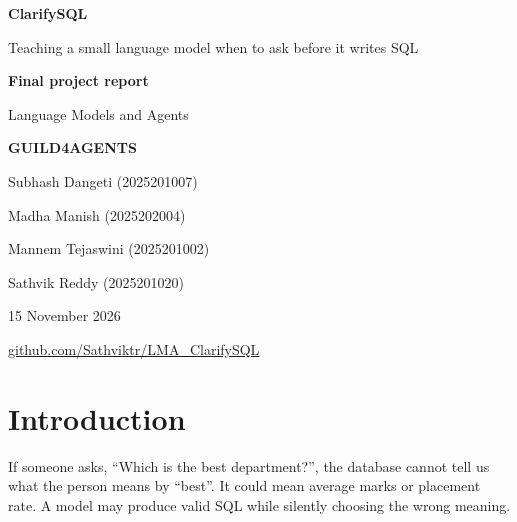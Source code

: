 \documentclass[11pt,a4paper]{article}
\newcommand{\repo}{https://github.com/Sathviktr/LMA_ClarifySQL}
\newcommand{\reportdate}{15 November 2026}
\begin{document}
\begin{center}
{\LARGE\bfseries ClarifySQL}\par
{\large Teaching a small language model when to ask before it writes SQL}\par
\vspace{5pt}
{\large\bfseries Final project report}\par
Language Models and Agents\par
\textbf{GUILD4AGENTS}\par
Subhash Dangeti (2025201007)\par
Madha Manish (2025202004)\par
Mannem Tejaswini (2025201002)\par
Sathvik Reddy (2025201020)\par
\reportdate\par
\href{\repo}{github.com/Sathviktr/LMA\_ClarifySQL}
\end{center}

\begin{abstract}
Text-to-SQL models can write a valid query even when a user's request is missing an important detail.
We built ClarifySQL to study when a small language model should inspect the database, ask a question,
execute a query or abstain. We train QLoRA policy adapters for Qwen3-4B-Instruct-2507 while keeping the
SQL writer fixed. Our constructed dataset has 307 training, 53 validation and 188 test episodes, with
a separate check on 59 CoSQL turns. On 148 answerable test episodes, the two trained seeds average
76.35\% execution accuracy, compared with 63.51\% for the prompted agent. The gain is 12.84 percentage
points, with a 95\% paired database-bootstrap interval of [5.55, 19.08]. However, correct abstention
declines, the no-slot ablation does not establish a benefit from explicit slots, and natural-dialogue
results are mixed. Human reviews and a fictional university demo show remaining problems with question
wording, unresolved details and SQL that returns the right answer by coincidence. Code, saved results
and reproduction instructions are available at \url{\repo}.
\end{abstract}

\section{Introduction}

If someone asks, ``Which is the best department?'', the database cannot tell us what the person means
by ``best''. It could mean average marks or placement rate. A model may produce valid SQL while
silently choosing the wrong meaning.
\end{document}
